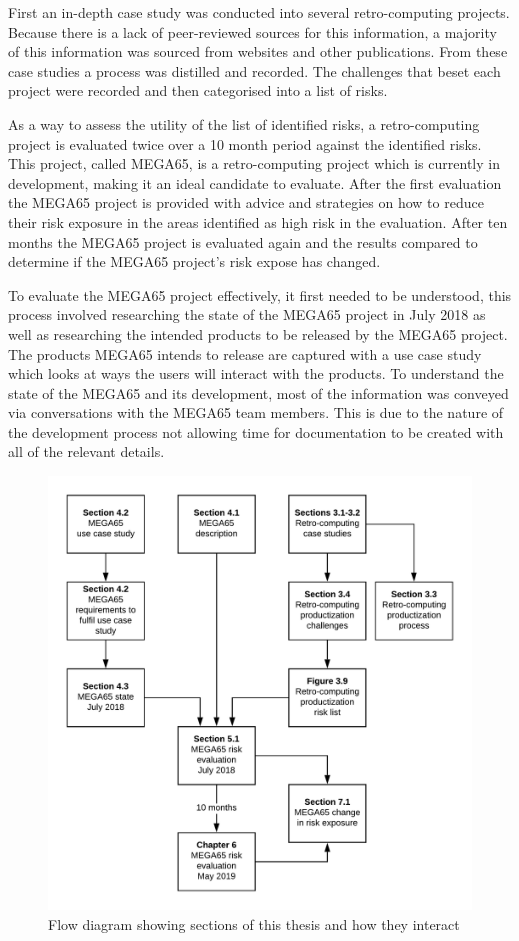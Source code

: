 First an in-depth case study was conducted into several retro-computing projects. Because there is a lack of peer-reviewed sources for this information, a majority of this information was sourced from websites and other publications. From these case studies a process was distilled and recorded. The challenges that beset each project were recorded and then categorised into a list of risks. 

As a way to assess the utility of the list of identified risks, a retro-computing project is evaluated twice over a 10 month period against the identified risks. This project, called MEGA65, is a retro-computing project which is currently in development, making it an ideal candidate to evaluate. After the first evaluation the MEGA65 project is provided with advice and strategies on how to reduce their risk exposure in the areas identified as high risk in the evaluation. After ten months the MEGA65 project is evaluated again and the results compared to determine if the MEGA65 project's risk expose has changed. 

To evaluate the MEGA65 project effectively, it first needed to be understood, this process involved researching the state of the MEGA65 project in July 2018 as well as researching the intended products to be released by the MEGA65 project. The products MEGA65 intends to release are captured with a use case study which looks at ways the users will interact with the products. To understand the state of the MEGA65 and its development, most of the information was conveyed via conversations with the MEGA65 team members. This is due to the nature of the development process not allowing time for documentation to be created with all of the relevant details. 

\begin{figure} \begin{center}
\includegraphics[width=.8\linewidth]{pics/thesis_methodology} 
\end{center} 
\caption{Flow diagram showing sections of this thesis and how they interact}
\label{methodology_diagram}
\end{figure}

